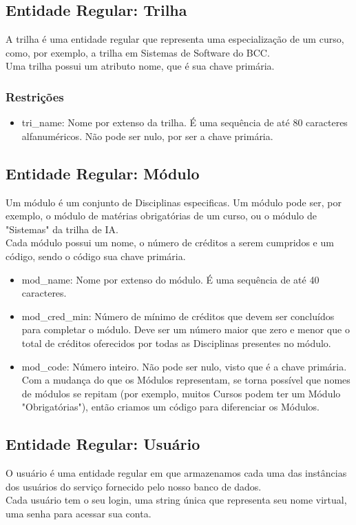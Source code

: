 \documentclass{article}
\begin{document}
  	\subsection{Entidade Regular: Trilha}
  	    \quad A trilha é uma entidade regular que representa uma especialização de um curso, como, por exemplo, a trilha em Sistemas de Software do BCC. \\
  	    \quad Uma trilha possui um atributo nome, que é sua chave primária.
  	    \subsubsection{Restrições}
  	        \begin{itemize}
  	            \item tri\_name: Nome por extenso da trilha. É uma sequência de até 80 caracteres alfanuméricos. Não pode ser nulo, por ser a chave primária.
  		    \end{itemize}
  		    
  	\subsection{Entidade Regular: Módulo}
  	    \quad Um módulo é um conjunto de Disciplinas especificas. Um módulo pode ser, por exemplo, o módulo de matérias obrigatórias de um curso, ou o módulo de "Sistemas" da trilha de IA. \\
  	    \quad Cada módulo possui um nome, o número de créditos a serem cumpridos e um código, sendo o código sua chave primária.
  	    \begin{itemize}
  	            \item mod\_name: Nome por extenso do módulo. É uma sequência de até 40 caracteres.
  	            \item mod\_cred\_min: Número de mínimo de créditos que devem ser concluídos para completar o módulo. Deve ser um número maior que zero e menor que o total de créditos oferecidos por todas as Disciplinas presentes no módulo.
  	            \item mod\_code: Número inteiro. Não pode ser nulo, visto que é a chave primária. Com a mudança do que os Módulos representam, se torna possível que nomes de módulos se repitam (por exemplo, muitos Cursos podem ter um Módulo "Obrigatórias"), então criamos um código para diferenciar os Módulos.
  		    \end{itemize}
  		    
  	\subsection{Entidade Regular: Usuário}
  	    \quad O usuário é uma entidade regular em que armazenamos cada uma das instâncias dos usuários do serviço fornecido pelo nosso banco de dados. \\
  	    \quad Cada usuário tem o seu login, uma string única que representa seu nome virtual, uma senha para acessar sua conta.
\end{document}
